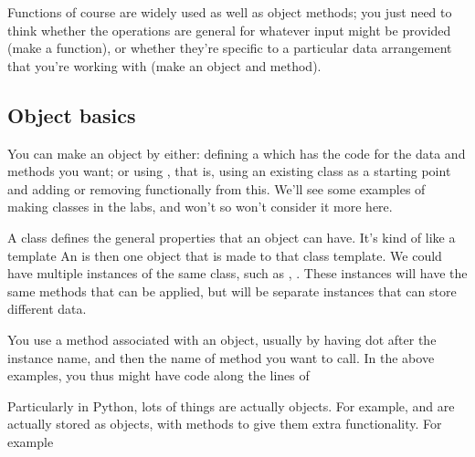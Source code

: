 \documentclass[letterpaper,10pt,british]{sphinxmanual}
\begin{document}
\sphinxAtStartPar
Functions of course are widely used as well as object methods; you just need to think whether the operations are general for whatever input might be provided (make a function), or whether they’re specific to a particular data arrangement that you’re working with (make an object and method).


\subsection{Object basics}
\label{\detokenize{chapters/programming_fundamentals/objects:object-basics}}
\sphinxAtStartPar
You can make an object by either: defining a  which has the code for the data and methods you want; or using , that is, using an existing class as a starting point and adding or removing functionally from this. We’ll see some examples of making classes in the labs, and won’t so won’t consider it more here.

\sphinxAtStartPar
A class defines the general properties that an object can have. It’s kind of like a template An  is then one object that is made to that class template. We could have multiple instances of the same class, such as , . These instances will have the same methods that can be applied, but will be separate instances that can store different data.

\sphinxAtStartPar
You use a method associated with an object, usually by having dot  after the instance name, and then the name of method you want to call. In the above examples, you thus might have code along the lines of

\begin{sphinxVerbatim}[commandchars=\\\{\}]
\end{sphinxVerbatim}

\sphinxAtStartPar
Particularly in Python, lots of things are actually objects. For example, {\hyperref[\detokenize{chapters/programming_fundamentals/variables:lists}]{}} and {\hyperref[\detokenize{chapters/programming_fundamentals/variables:dictionaries}]{}} are actually stored as objects, with methods to give them extra functionality. For example
\end{document}
